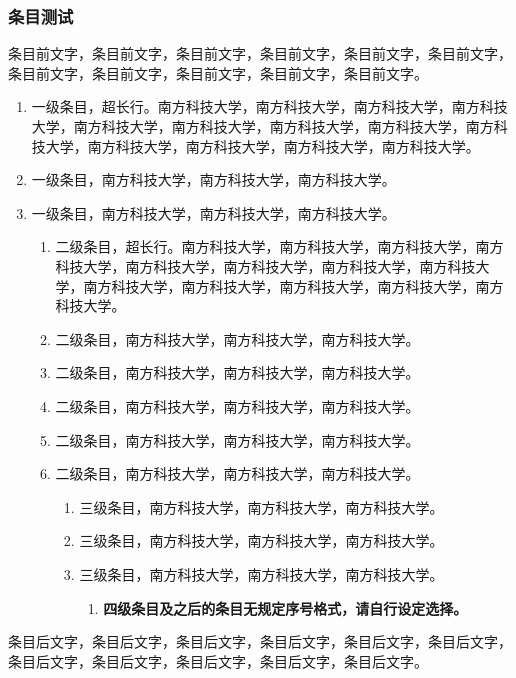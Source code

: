 \subsubsection{条目测试}


条目前文字，条目前文字，条目前文字，条目前文字，条目前文字，条目前文字，条目前文字，条目前文字，条目前文字，条目前文字，条目前文字。

\begin{enumerate}
  \item 一级条目，超长行。南方科技大学，南方科技大学，南方科技大学，南方科技大学，南方科技大学，南方科技大学，南方科技大学，南方科技大学，南方科技大学，南方科技大学，南方科技大学，南方科技大学，南方科技大学。
  \item 一级条目，南方科技大学，南方科技大学，南方科技大学。
  \item 一级条目，南方科技大学，南方科技大学，南方科技大学。
  \begin{enumerate}
    \item 二级条目，超长行。南方科技大学，南方科技大学，南方科技大学，南方科技大学，南方科技大学，南方科技大学，南方科技大学，南方科技大学，南方科技大学，南方科技大学，南方科技大学，南方科技大学，南方科技大学。
    \item 二级条目，南方科技大学，南方科技大学，南方科技大学。
    \item 二级条目，南方科技大学，南方科技大学，南方科技大学。
    \item 二级条目，南方科技大学，南方科技大学，南方科技大学。
    \item 二级条目，南方科技大学，南方科技大学，南方科技大学。
    \item 二级条目，南方科技大学，南方科技大学，南方科技大学。
    \begin{enumerate}
      \item 三级条目，南方科技大学，南方科技大学，南方科技大学。
      \item 三级条目，南方科技大学，南方科技大学，南方科技大学。
      \item 三级条目，南方科技大学，南方科技大学，南方科技大学。
      \begin{enumerate}
        \item \textbf{四级条目及之后的条目无规定序号格式，请自行设定选择。}
      \end{enumerate}
    \end{enumerate}
  \end{enumerate}
\end{enumerate}

条目后文字，条目后文字，条目后文字，条目后文字，条目后文字，条目后文字，条目后文字，条目后文字，条目后文字，条目后文字，条目后文字。
